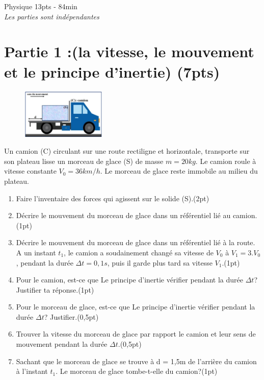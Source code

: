 \documentclass[12pt]{article}
\begin{document}

\begin{center}
    \vspace{2cm}
\hrulefill
\Large{Physique 13pts - 84min}
\hrulefill\\
    \emph{Les  parties sont indépendantes}
\end{center}
 \section*{Partie 1 :(la vitesse, le mouvement et le principe d'inertie) \dotfill(7pts)}

\begin{figure}
	\vspace{-0.8cm}
	\includegraphics[width=0.36\textwidth]{./img/camion.png}
\end{figure}


Un camion (C) circulant sur une route rectiligne et horizontale,
transporte sur son plateau lisse un morceau de glace (S) de masse
$m = 20kg$. Le camion roule à vitesse constante $V_0 = 36km/h$. Le
morceau de glace reste immobile au milieu du plateau.
\vspace{1cm}
\begin{enumerate}
  \item Faire l'inventaire des forces qui agissent sur le solide (S).\dotfill(2pt)
  \item  Décrire le mouvement du morceau de glace dans un référentiel
lié au camion.\dotfill(1pt)
\item  Décrire le mouvement du morceau de glace dans un référentiel lié à la route.
A un instant $t_1$, le camion a soudainement changé sa vitesse de $V_0$ à $V_1 = 3.V_0$, pendant la durée
    $\Delta{t}=0,1s$, puis il garde plus tard sa vitesse $V_1$.\dotfill(1pt)
  \item  Pour le camion, est-ce que Le principe d’inertie vérifier pendant la durée $\Delta{t}$? Justifier ta réponse.\dotfill(1pt)

\item  Pour le morceau de glace, est-ce que Le principe d’inertie vérifier pendant la durée $\Delta{t}$? Justifier.\dotfill(0,5pt)
\item Trouver la vitesse du morceau de glace par rapport le camion et leur sens de mouvement pendant la
  durée $\Delta{t}$.\dotfill(0,5pt)
\item Sachant que le morceau de glace se trouve à d = 1,5m de l'arrière du camion à l’instant $t_1$. Le
morceau de glace tombe-t-elle du camion?\dotfill(1pt)

\end{enumerate}
\end{document}

